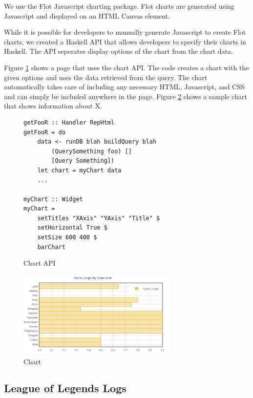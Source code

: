 \documentclass{chi2009}
\begin{document}
We use the Flot Javascript charting package. Flot charts are generated using Javascript and displayed on an HTML Canvas element. 

While it is possible for developers to manually generate Javascript to create Flot charts, we created a Haskell API that allows developers to specify their charts in Haskell. The API seperates display options of the chart from the chart data.

Figure \ref{chartcode} shows a page that uses the chart API. The code creates a chart with the given options and uses the data retrieved from the query. The chart automatically takes care of including any necessary HTML, Javascript, and CSS and can simply be included anywhere in the page. Figure \ref{chart} shows a sample chart that shows information about X.

\begin{figure}[]
\begin{verbatim}
getFooR :: Handler RepHtml
getFooR = do
    data <- runDB blah buildQuery blah
        (QuerySomething foo) []
        [Query Something])
    let chart = myChart data
    ...

myChart :: Widget
myChart = 
    setTitles "XAxis" "YAxis" "Title" $
    setHorizontal True $
    setSize 600 400 $
    barChart
\end{verbatim}
    \caption{Chart API}
    \label{chartcode}
\end{figure}

\begin{figure}[h]
    \includegraphics[width=80mm]{imgs/chart.png}
    \caption{Chart}
    \label{chart}
\end{figure}

\subsection{League of Legends Logs}
\end{document}
